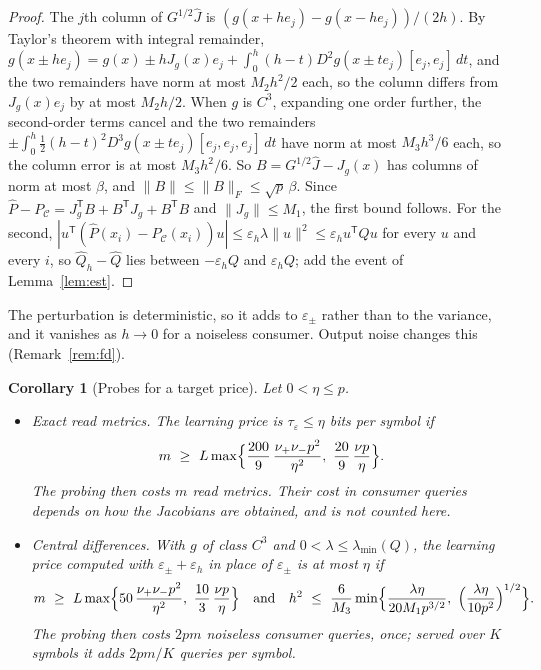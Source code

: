 \documentclass[11pt,onecolumn]{IEEEtran}
\newtheorem{corollary}[theorem]{Corollary}
\newcommand{\PC}{P_{\mathcal C}}
\newcommand{\nup}{\nu_{+}}
\newcommand{\num}{\nu_{-}}
\newcommand{\lmin}{\lambda_{\min}}
\begin{document}
\begin{proof}
The $j$th column of $G^{1/2}\hat J$ is $(g(x+he_j)-g(x-he_j))/(2h)$. By Taylor's
theorem with integral remainder,
$g(x\pm he_j)=g(x)\pm hJ_g(x)e_j+\int_0^h(h-t)D^2g(x\pm te_j)[e_j,e_j]\,dt$, and the
two remainders have norm at most $M_2h^2/2$ each, so the column differs from
$J_g(x)e_j$ by at most $M_2h/2$. When $g$ is $C^3$, expanding one order further, the
second-order terms cancel and the two remainders
$\pm\int_0^h\tfrac12(h-t)^2D^3g(x\pm te_j)[e_j,e_j,e_j]\,dt$ have norm at most $M_3h^3/6$
each, so the column error is at most $M_3h^2/6$. So $B=G^{1/2}\hat J-J_g(x)$ has
columns of norm at most $\beta$, and $\|B\|\le\|B\|_F\le\sqrt p\,\beta$. Since
$\hat P-\PC=J_g^{\mathsf T}B+B^{\mathsf T}J_g+B^{\mathsf T}B$ and $\|J_g\|\le M_1$, the
first bound follows. For the second, $|u^{\mathsf T}(\hat P(x_i)-\PC(x_i))u|\le
\varepsilon_h\lambda\|u\|^2\le\varepsilon_hu^{\mathsf T}Qu$ for every $u$ and every $i$, so
$\hat Q_h-\hat Q$ lies between $-\varepsilon_hQ$ and $\varepsilon_hQ$; add the event of
Lemma~\ref{lem:est}.
\end{proof}

The perturbation is deterministic, so it adds to $\varepsilon_\pm$ rather than to the
variance, and it vanishes as $h\to0$ for a noiseless consumer. Output noise changes
this (Remark~\ref{rem:fd}).

\begin{corollary}[Probes for a target price]\label{cor:n}
Let $0<\eta\le p$.
\begin{itemize}
\item[(i)] \emph{Exact read metrics.} The learning price is $\tau_\varepsilon\le\eta$
bits per symbol if
\[
m\ \ge\ L\max\Bigl\{\frac{200}9\,\frac{\nup\num p^2}{\eta^2},\ \frac{20}9\,\frac{\nu p}\eta\Bigr\}.
\]
The probing then costs $m$ read metrics. Their cost in consumer queries depends on how
the Jacobians are obtained, and is not counted here.
\item[(ii)] \emph{Central differences.} With $g$ of class $C^3$ and $0<\lambda\le\lmin(Q)$,
the learning price computed with $\varepsilon_\pm+\varepsilon_h$ in place of
$\varepsilon_\pm$ is at most $\eta$ if
\[
m\ \ge\ L\max\Bigl\{50\,\frac{\nup\num p^2}{\eta^2},\ \frac{10}3\,\frac{\nu p}\eta\Bigr\}
\quad\text{and}\quad
h^2\ \le\ \frac6{M_3}\min\Bigl\{\frac{\lambda\eta}{20M_1p^{3/2}},\ \Bigl(\frac{\lambda\eta}{10p^2}\Bigr)^{1/2}\Bigr\}.
\]
The probing then costs $2pm$ noiseless consumer queries, once; served over $K$ symbols
it adds $2pm/K$ queries per symbol.
\end{itemize}
\end{corollary}
\end{document}
